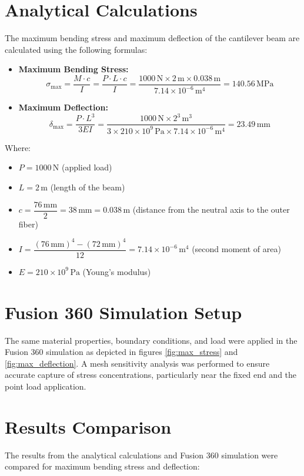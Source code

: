 \section{Analytical Calculations}
The maximum bending stress and maximum deflection of the cantilever beam are calculated using the following formulas:

\begin{itemize}
    \item \textbf{Maximum Bending Stress:}
    \[
    \sigma_{\text{max}} = \frac{M \cdot c}{I} = \frac{P \cdot L \cdot c}{I} = \frac{1000\,\text{N} \times 2\,\text{m} \times 0.038\,\text{m}}{7.14 \times 10^{-6}\,\text{m}^4} = 140.56\,\text{MPa}
    \]
    \item \textbf{Maximum Deflection:}
    \[
    \delta_{\text{max}} = \frac{P \cdot L^3}{3 E I} = \frac{1000\,\text{N} \times 2^3\,\text{m}^3}{3 \times 210 \times 10^9\,\text{Pa} \times 7.14 \times 10^{-6}\,\text{m}^4} = 23.49\,\text{mm}
    \]
\end{itemize}

Where:

\begin{itemize}
    \item \( P = 1000\,\text{N} \) (applied load)
    \item \( L = 2\,\text{m} \) (length of the beam)
    \item \( c = \dfrac{76\,\text{mm}}{2} = 38\,\text{mm} = 0.038\,\text{m} \) (distance from the neutral axis to the outer fiber)
    \item \( I = \dfrac{(76\,\text{mm})^4 - (72\,\text{mm})^4}{12} = 7.14 \times 10^{-6}\,\text{m}^4 \) (second moment of area)
    \item \( E = 210 \times 10^9\,\text{Pa} \) (Young's modulus)
\end{itemize}

\section{Fusion 360 Simulation Setup}
The same material properties, boundary conditions, and load were applied in the Fusion 360 simulation as depicted in figures \ref{fig:max_stress} and \ref{fig:max_deflection}. A mesh sensitivity analysis was performed to ensure accurate capture of stress concentrations, particularly near the fixed end and the point load application.

\section{Results Comparison}
The results from the analytical calculations and Fusion 360 simulation were compared for maximum bending stress and deflection:

